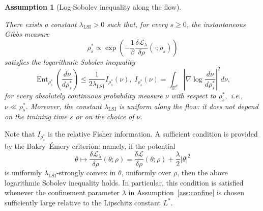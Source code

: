 \documentclass[11pt,a4wide]{article}
\newtheorem{assumption}{Assumption}
\theoremstyle{definition}
\newcommand{\R}{\mathbb{R}}
\DeclareMathOperator{\Ent}{Ent}
\begin{document}
\begin{assumption}[Log-Sobolev inequality along the flow]
\label{ass:lsi}

There exists a constant $\lambda_{\mathrm{LSI}}>0$ such that, for every
$s\ge0$, the instantaneous Gibbs measure
\[
\rho_s^*
\propto
\exp\!\left(
-\frac{1}{\beta}
\frac{\delta\mathcal L_\lambda}{\delta\rho}
(\cdot;\rho_s)
\right)
\]
satisfies the logarithmic Sobolev inequality
\[
\Ent_{\rho_s^*}\!\left(\frac{d\nu}{d\rho_s^*}\right)
\le
\frac{1}{2\lambda_{\mathrm{LSI}}}
I_{\rho_s^*}(\nu), \; I_{\rho_s^*}(\nu)= \int_{\R^d} | \nabla \log \frac{ d\nu }{ d\rho_s^* } |^2 d \nu,  
\]
for every  absolutely continuous probability measure $\nu$ with respect to $\rho_s^*,$ i.e., $\nu\ll\rho_s^*$. Moreover, the
constant $\lambda_{\mathrm{LSI}}$ is uniform along the flow: it does not depend on the training time $s$ or on the choice of $\nu$. 
\end{assumption}


Note that  $I_{\rho_s^*}$ is the relative Fisher information.  A sufficient condition is provided by the Bakry--Émery criterion: namely,
if the potential
\[
\theta
\longmapsto
\frac{\delta\mathcal L_\lambda}{\delta\rho}(\theta;\rho)
=
\frac{\delta\mathcal L}{\delta\rho}(\theta;\rho)
+\frac{\lambda}{2}|\theta|^2
\]
is uniformly $\lambda_{\mathrm{LSI}}$-strongly convex in $\theta$, uniformly
over $\rho$, then the above logarithmic Sobolev inequality holds. In
particular, this condition is satisfied whenever the confinement parameter
$\lambda$ in Assumption~\ref{ass:confine} is chosen sufficiently large
relative to the Lipschitz constant $L^*$.
\end{document}
